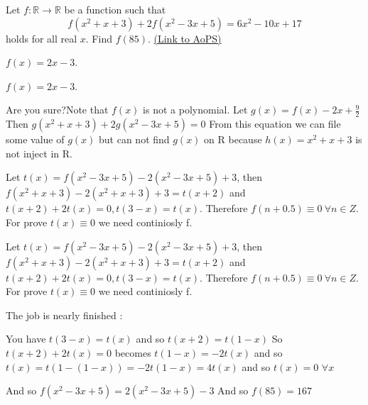 \begin{problem}
	Let $f: \mathbb R \to \mathbb R$ be a function such that
\[f(x^2 + x + 3) + 2f(x^2 - 3x + 5) = 6x^2 - 10x + 17\]
holds for all real $x$. Find $ f(85)$.
	\flushright \href{https://artofproblemsolving.com/community/c6h175973}{(Link to AoPS)}
\end{problem}



\begin{mysolution}
	$ f(x)=2x-3$.
\end{mysolution}



\begin{mysolution}
	\begin{tcolorbox}$ f(x) = 2x - 3$.\end{tcolorbox}
Are you sure?Note that $ f(x)$ is not a polynomial.
Let $ g(x)=f(x)-2x+\frac{9}{2}$
Then 
$ g(x^2+x+3)+2g(x^2-3x+5)=0$
From this equation we can file some value of $ g(x)$ but can not find $ g(x)$ on R because $ h(x)=x^2+x+3$ is not inject in R.
\end{mysolution}



\begin{mysolution}
	Let $ t(x) = f(x^2 - 3x + 5) - 2(x^2 - 3x + 5) + 3$, then $ f(x^2 + x + 3) - 2(x^2 + x + 3) + 3 = t(x + 2)$ and $ t(x + 2) + 2t(x) = 0,t(3 - x) = t(x)$.
Therefore $ f(n + 0.5) \equiv 0 \ \forall n\in Z$.
For prove $ t(x) \equiv 0$ we need continiosly f.
\end{mysolution}



\begin{mysolution}
	\begin{tcolorbox}Let $ t(x) = f(x^2 - 3x + 5) - 2(x^2 - 3x + 5) + 3$, then $ f(x^2 + x + 3) - 2(x^2 + x + 3) + 3 = t(x + 2)$ and $ t(x + 2) + 2t(x) = 0,t(3 - x) = t(x)$.
Therefore $ f(n + 0.5) \equiv 0 \ \forall n\in Z$.
For prove $ t(x) \equiv 0$ we need continiosly f.\end{tcolorbox}

The job is nearly finished :

You have  $ t(3-x)=t(x)$ and so $ t(x+2)=t(1-x)$
So $ t(x+2)+2t(x)=0$ becomes $ t(1-x)=-2t(x)$ and so $ t(x)=t(1-(1-x))=-2t(1-x)=4t(x)$ and so $ t(x)=0$ $ \forall x$

And so  $ f(x^2 - 3x + 5) = 2(x^2 - 3x + 5) - 3$
And so $ f(85)=167$
\end{mysolution}



